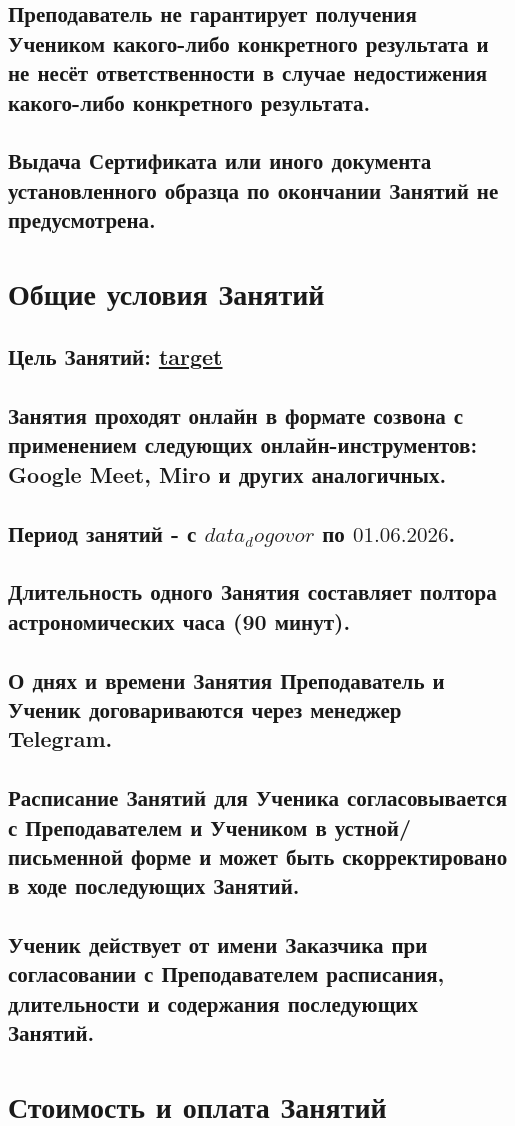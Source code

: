 \documentclass[a4paper,12pt]{article}
\begin{document}
\subsection{Преподаватель не гарантирует получения Учеником какого-либо конкретного результата и не несёт ответственности в случае недостижения какого-либо конкретного результата.}
\subsection{Выдача Сертификата или иного документа установленного образца по окончании Занятий не предусмотрена.}
\newpage
\Large{\section{Общие условия Занятий}}
\subsection{Цель Занятий: \uline{ {{target}} }}
\subsection{Занятия проходят онлайн в формате созвона с применением следующих онлайн-инструментов: Google Meet, Miro и других аналогичных.}
\subsection{Период занятий - с ${{data_dogovor}}$ по $01.06.2026$.}
\subsection{Длительность одного Занятия составляет полтора астрономических часа (90 минут).}
\subsection{О днях и времени Занятия Преподаватель и Ученик договариваются через менеджер Telegram.}
\subsection{Расписание Занятий для Ученика согласовывается с Преподавателем и Учеником в устной/письменной форме и может быть скорректировано в ходе последующих Занятий.}
\subsection{Ученик действует от имени Заказчика при согласовании с Преподавателем расписания, длительности и содержания последующих Занятий.}
\Large\section{Стоимость и оплата Занятий}
\end{document}
